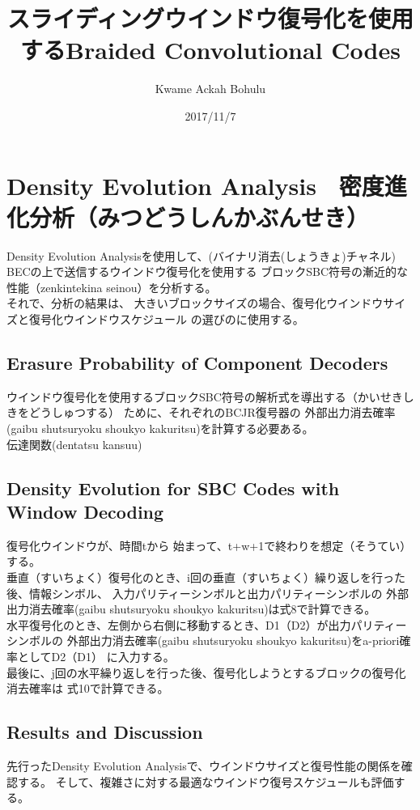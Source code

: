 \documentclass[20 pts]{article}
\title{スライディングウインドウ復号化を使用するBraided Convolutional Codes }
\author{Kwame Ackah Bohulu}
\date{2017/11/7}
\begin{document}
\maketitle

\newpage
\section{Density Evolution Analysis　密度進化分析（みつどうしんかぶんせき）}
Density Evolution Analysisを使用して、(バイナリ消去(しょうきょ)チャネル)
BECの上で送信するウインドウ復号化を使用する
ブロックSBC符号の漸近的な性能（zenkintekina seinou）を分析する。\\
それで、分析の結果は、
大きいブロックサイズの場合、復号化ウインドウサイズと復号化ウインドウスケジュール
の選びのに使用する。
\subsection{Erasure Probability of Component Decoders}
ウインドウ復号化を使用するブロックSBC符号の解析式を導出する（かいせきしきをどうしゅつする）
ために、それぞれのBCJR復号器の
外部出力消去確率(gaibu shutsuryoku shoukyo kakuritsu)を計算する必要ある。\\

伝達関数(dentatsu kansuu)

\subsection{Density Evolution for SBC Codes with Window Decoding}
復号化ウインドウが、時間tから 始まって、t+w+1で終わりを想定（そうてい）する。\\


垂直（すいちょく）復号化のとき、i回の垂直（すいちょく）繰り返しを行った後、情報シンボル、
入力パリティーシンボルと出力パリティーシンボルの
外部出力消去確率(gaibu shutsuryoku shoukyo kakuritsu)は式8で計算できる。\\

水平復号化のとき、左側から右側に移動するとき、D1（D2）が出力パリティーシンボルの
外部出力消去確率(gaibu shutsuryoku shoukyo kakuritsu)をa-priori確率としてD2（D1）
に入力する。\\

最後に、j回の水平繰り返しを行った後、復号化しようとするブロックの復号化消去確率は
式10で計算できる。


\subsection{Results and Discussion}
先行ったDensity Evolution Analysisで、ウインドウサイズと復号性能の関係を確認する。
そして、複雑さに対する最適なウインドウ復号スケジュールも評価する。\\
\end{document}
